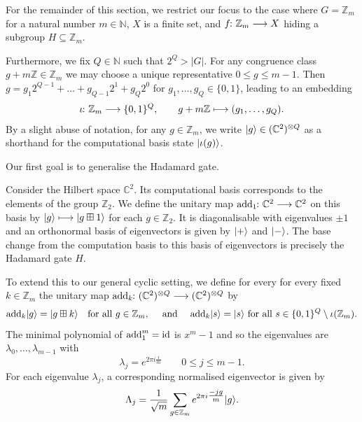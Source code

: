 \documentclass[a4paper, oneside, 12pt]{amsart}
\begin{document}
\begin{convention}
  For the remainder of this section, we restrict our focus to the case where \(G = \mathbb{Z}_{m}\) for a natural number \(m \in \mathbb{N}\), \(X\) is a finite set, and \(f \from \mathbb{Z}_m \to X\) hiding a  subgroup \(H \subseteq \mathbb{Z}_m\).

  Furthermore, we fix  \(Q\in \mathbb{N}\) such that \(2^{Q}>|G|\).
  For any congruence class \(g+m \mathbb{Z} \in \mathbb{Z}_{m}\) we may choose a unique representative \(0\leq g \leq m-1\).
  Then \(g= g_{1}2^{Q-1} + \dots + g_{Q-1}2^{1} + g_{Q}2^{0}\) for \(g_{1}, \dots , g_{Q}\in\{0,1\}\), leading to an embedding
  \begin{equation*}
    \iota \from \mathbb{Z}_{m}\to\{0,1\}^{Q}, \qquad g+ m \mathbb{Z} \mapsto (g_{1}, \dots , g_{Q}).
  \end{equation*}
  By a slight abuse of notation, for any \(g \in \mathbb{Z}_m\), we write \(\lvert g\rangle\in ( \mathbb{C}^{2})^{\otimes Q}\) as a shorthand for the computational basis state \(\lvert\iota(g)\rangle\).
\end{convention}

Our first goal is to generalise the Hadamard gate.

\begin{remark}\label{rmk:Hadamard-and-the-group-Z2}
  Consider the Hilbert space \(\mathbb{C}^2\).
  Its  computational basis corresponds to the elements of the group \(\mathbb{Z}_2\).
  We define the unitary map \(\mathrm{add}_{1} \from \mathbb{C}^2 \to \mathbb{C}^2\) on this basis by \(\lvert g\rangle \longmapsto \lvert g \boxplus 1\rangle\) for each \(g \in \mathbb{Z}_2\).
  It is diagonalisable with eigenvalues \(\pm 1\) and an orthonormal basis of eigenvectors is given by \(\lvert+\rangle\) and \(\lvert-\rangle\).
  The base change from the computation basis to this basis of eigenvectors is  precisely the Hadamard gate \(H\).
\end{remark}

To extend this to our general cyclic setting, we define for every for every fixed \(k \in \mathbb{Z}_m\) the unitary map \(\mathrm{add}_{k} \from ( \mathbb{C}^{2})^{\otimes Q} \to ( \mathbb{C}^{2})^{\otimes Q}\)  by
\begin{equation}
  \mathrm{add}_{k} \lvert g\rangle = \lvert g \boxplus k\rangle \quad \text{for all } g \in \mathbb{Z}_m,
  \quad
  \text{ and }
  \quad
  \mathrm{add}_{k}\lvert s\rangle = \lvert s\rangle \text{ for all } s \in \{0,1\}^{Q} \setminus \iota(\mathbb{Z}_m).
\end{equation}
The minimal polynomial of  \(\mathrm{add}_{1}^m = \mathrm{id}\) is  \(x^m - 1\) and so the eigenvalues are \(\lambda_{0}, \dots , \lambda_{m-1}\) with
\begin{equation}
  \lambda_{j} = e^{2\pi i\tfrac{i}{m}} \qquad 0\leq j \leq m-1.
\end{equation}
For each eigenvalue \(\lambda_{j}\), a corresponding normalised eigenvector is given by
\begin{equation*}
  \Lambda_{j} = \frac{1}{\sqrt{m}} \sum_{g\in \mathbb{Z}_{m}} e^{2\pi i \tfrac{-jg}{m}}\lvert g\rangle.
\end{equation*}
\end{document}
